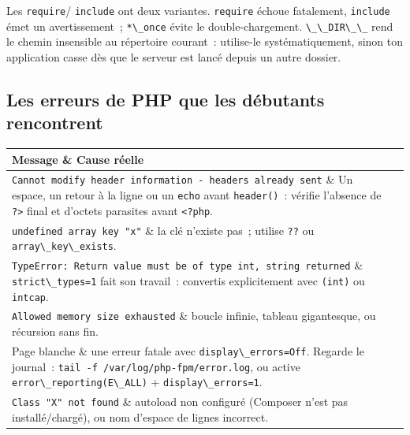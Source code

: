 \documentclass[12pt,a4paper,twoside,openright]{book}
\makeatletter
\newenvironment{tabz}[1]{\rowcolors{2}{white}{tralight}%
  \small\setlength{\tabcolsep}{5pt}\setlength{\LTpre}{3pt}\setlength{\LTpost}{3pt}%
  \begin{longtable}{@{}#1@{}}\toprule}
  {\bottomrule\end{longtable}\normalfont\setlength{\tabcolsep}{6pt}}
\newcommand{\thd}[1]{\textbf{\color{white}#1}}
\newcommand{\headrow}{\rowcolor{theadbg}}
\makeatother
\begin{document}
\begin{note}
Les \verb|require|/ \verb|include| ont deux variantes. \verb|require| \'echoue fatalement,
\verb|include| \'emet un avertissement~; \verb|*\_once| \'evite le double-chargement. \verb|\_\_DIR\_\_| rend
le chemin insensible au r\'epertoire courant~: utilise-le syst\'ematiquement, sinon ton application
casse d\`es que le serveur est lanc\'e depuis un autre dossier.
\end{note}

\subsection{Les erreurs de PHP que les d\'ebutants rencontrent}

\begin{tabz}{lX}
  \headrow \thd{Message} \& \thd{Cause r\'eelle} \\
  \midrule
  \verb|Cannot modify header information - headers already sent| \& Un espace, un retour \`a la ligne ou un \verb|echo| avant \verb|header()|~: v\'erifie l'absence de \verb|?>| final et d'octets parasites avant \verb|<?php|. \\
  \verb|undefined array key "x"| \& la cl\'e n'existe pas~; utilise \verb|??| ou \verb|array\_key\_exists|. \\
  \verb|TypeError: Return value must be of type int, string returned| \& \verb|strict\_types=1| fait son travail~: convertis explicitement avec \verb|(int)| ou \verb|intcap|. \\
  \verb|Allowed memory size exhausted| \& boucle infinie, tableau gigantesque, ou r\'ecursion sans fin. \\
  Page blanche \& une erreur fatale avec \verb|display\_errors=Off|. Regarde le journal~: \verb|tail -f /var/log/php-fpm/error.log|, ou active \verb|error\_reporting(E\_ALL)| + \verb|display\_errors=1|. \\
  \verb|Class "X" not found| \& autoload non configur\'e (Composer n'est pas install\'e/charg\'e), ou nom d'espace de lignes incorrect. \\
\end{tabz}
\end{document}

